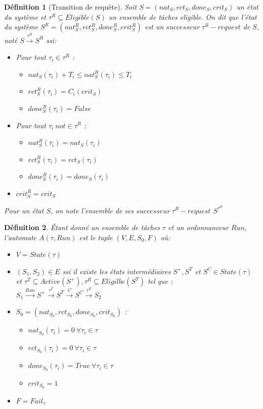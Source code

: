 \documentclass[11pt,a4paper,oneside]{book}
\theoremstyle{break}
\newtheorem{defin}{Définition}
\theoremstyle{breakplain}
\begin{document}
\begin{defin}[Transition de requête]
\label{treq}
Soit $S = (nat_S, rct_S, done_S, crit_S)$ un état du système et $\tau^R \subseteq Eligible(S)$ un ensemble de tâches eligible. On dit que l'état du système $S^R = (nat_S^R, rct_S^R, done_S^R, crit_S^R)$ est un $successeur\ \tau^R-request$ de $S$, noté $S\xrightarrow{\tau^R}S^R$ ssi:

\begin{itemize}
\item Pour tout $\tau_i \in \tau^R$ :\begin{itemize}
    \item $nat_S(\tau_i)+T_i \leq nat_S^R(\tau_i) \leq T_i$
    \item $rct_S^R(\tau_i)=C_i(crit_S)$
    \item $done_S^R(\tau_i) = False$
\end{itemize}
\item Pour tout $\tau_i\ not \in \tau^R$ :\begin{itemize}
    \item $nat_S^R(\tau_i)=nat_S(\tau_i)$
    \item $rct_S^R(\tau_i)=rct_S(\tau_i)$
    \item $done_S^R(\tau_i) = done_S(\tau_i)$
\end{itemize}
\item $crit_S^R = crit_S$
\end{itemize}

Pour un état $S$, on note l'ensemble de ses $successeur\ \tau^R-request$ $S^{\tau^R}$

\end{defin}

\begin{defin} 
\label{autospo}
Étant donné un ensemble de tâches $\tau$ et un ordonnanceur $Run$, l'automate $A(\tau,Run)$ est le tuple $(V, E, S_0, F)$ où:
\begin{itemize}
\item  $V=State(\tau)$
\item $(S_1,S_2) \in E$ ssi il existe les états intermédiaires $S^{+}, S^{T}$ et $S^{C} \in State(\tau)$ et $\tau^T \subseteq Active(S^{+}),\tau^R \subseteq Eligilbe(S^{T}) $ tel que : \\$S_1\xrightarrow{Run}S^{+}\xrightarrow{\tau^T}S^{T}\xrightarrow{C}S^{C}\xrightarrow{\tau^R}S_2$
\item $S_0 = (nat_{S_0}, rct_{S_0}, done_{S_0}, crit_{S_0})$ :\begin{itemize}
\item $nat_{S_0}(\tau_i) = 0\ \forall \tau_i \in \tau$
\item $rct_{S_0}(\tau_i) = 0\ \forall \tau_i \in \tau$
\item $done_{S_0}(\tau_i) = True\ \forall \tau_i \in \tau$
\item $crit_{S_0} = 1$
\end{itemize}
\item $F = Fail_\tau$
\end{itemize}

\end{defin} 
\end{document}

